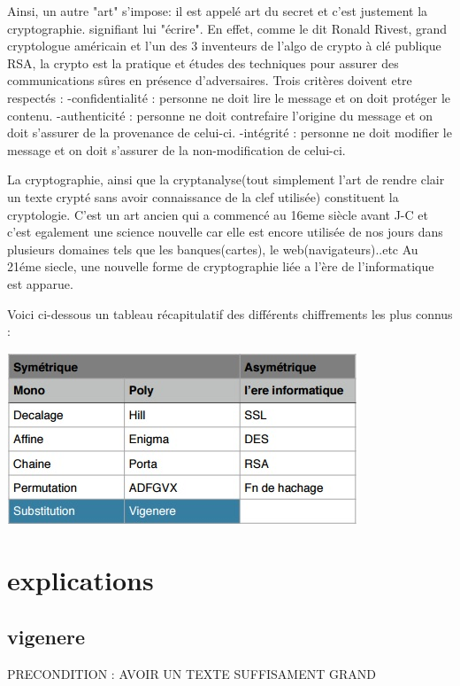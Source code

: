 \documentclass[a4]{article}
\begin{document}
				Ainsi, un autre "art" s'impose: il est appelé art du secret et c'est justement la cryptographie.
				signifiant lui "écrire". En effet, comme le dit Ronald Rivest, grand cryptologue américain et l'un des 3 inventeurs de l'algo
				de crypto à clé publique RSA, la crypto est la pratique et études des techniques pour assurer des communications sûres en présence d'adversaires.
				Trois critères doivent etre respectés : 
				-confidentialité : personne ne doit lire le message et on doit protéger le contenu.
				-authenticité : personne ne doit contrefaire l'origine du message et on doit s'assurer de la 							provenance de celui-ci.
				-intégrité : personne ne doit modifier le message et on doit s'assurer de la non-modification 							de celui-ci.

				La cryptographie, ainsi que la cryptanalyse(tout simplement l'art de rendre clair un texte crypté sans avoir connaissance de la clef utilisée) constituent la cryptologie.
				C'est un art ancien qui a commencé au 16eme siècle avant J-C et c'est egalement une science nouvelle car elle est encore utilisée de nos jours dans plusieurs domaines tels que les banques(cartes), le web(navigateurs)..etc
				Au 21éme siecle, une nouvelle forme de cryptographie liée a l'ère de l'informatique est apparue.
				
				Voici ci-dessous un tableau récapitulatif des différents chiffrements les plus connus :
				\\
				\begin{center}\includegraphics[scale=0.6]{Tab1.jpg}\end{center}
	\section{explications}
		\subsection{vigenere}
			PRECONDITION : AVOIR UN TEXTE SUFFISAMENT GRAND
\end{document}
